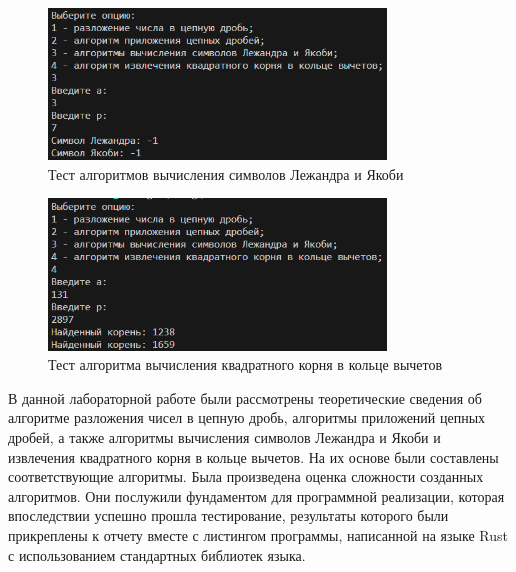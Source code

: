 \documentclass[bachelor, och, labwork]{shiza}
\begin{document}
        \begin{figure}[H]
            \centering
            \includegraphics[width=0.8\textwidth]{pic/5.png}
            \caption{Тест алгоритмов вычисления символов Лежандра и Якоби}
        \end{figure}

        \begin{figure}[H]
            \centering
            \includegraphics[width=0.8\textwidth]{pic/6.png}
            \caption{Тест алгоритма вычисления квадратного корня в кольце вычетов}
        \end{figure}
\conclusion

    В данной лабораторной работе были рассмотрены теоретические сведения об
    алгоритме разложения чисел в цепную дробь, алгоритмы приложений цепных
    дробей, а также алгоритмы вычисления символов Лежандра и Якоби и извлечения
    квадратного корня в кольце вычетов. На их основе были составлены
    соответствующие алгоритмы. Была произведена оценка сложности созданных
    алгоритмов. Они послужили фундаментом для программной реализации, которая
    впоследствии успешно прошла тестирование, результаты которого были
    прикреплены к отчету вместе с листингом программы, написанной на языке Rust
    с использованием стандартных библиотек языка.
\end{document}
